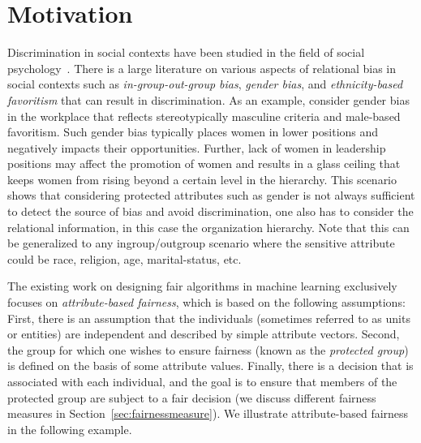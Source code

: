 \documentclass[11pt]{article}
\begin{document}
\section{Motivation}
\label{sec:motivation}

Discrimination in social contexts have been studied in the field of social psychology~\cite{brewer2007social,brewer1979group,ridgeway2004unpacking}. There is a large literature on various aspects of relational bias in social contexts such as \emph{in-group-out-group bias}, \emph{gender bias}, and \emph{ethnicity-based favoritism} that can result in discrimination. 
As an example, consider gender bias in the workplace that reflects stereotypically masculine criteria and male-based favoritism. Such gender bias 
typically places women in lower positions and negatively impacts their opportunities. Further, lack of women in leadership positions may affect the promotion of women and results in a glass ceiling that keeps women from rising beyond a certain level in the hierarchy. This scenario shows that considering  protected attributes such as gender is not always sufficient to detect the source of bias and avoid discrimination, one also has to consider the relational information, in this case the organization hierarchy. Note that this can be generalized to any ingroup/outgroup scenario where the sensitive attribute could be race, religion, age, marital-status, etc.

The existing work on designing fair algorithms in machine learning exclusively focuses on \emph{attribute-based fairness}, which is based on the following assumptions: First, there is an assumption that the individuals (sometimes referred to as units or entities) are independent and described by simple attribute vectors. Second, the group for which one wishes to ensure fairness (known as the \emph{protected group}) is defined on the basis of some attribute values. Finally, there is a decision that is associated with each individual, and the goal is to ensure that members of the protected group are subject to a fair decision (we discuss different fairness measures in Section~\ref{sec:fairnessmeasure}).  We illustrate  attribute-based fairness in the following example. 
\end{document}
